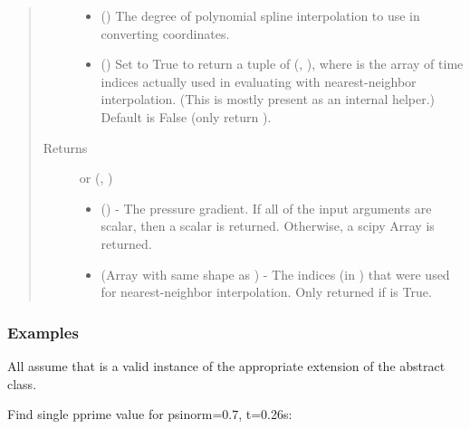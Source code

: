 \documentclass[letterpaper,10pt,english]{sphinxmanual}
\begin{document}
\begin{fulllineitems}
\begin{fulllineitems}
\begin{quote}
\begin{description}
\begin{itemize}
\item {} 
 () \textendash{} The degree of polynomial spline interpolation to
use in converting coordinates.

\item {} 
 () \textendash{} Set to True to return a tuple of (,
), where  is the array of time indices
actually used in evaluating  with nearest-neighbor
interpolation. (This is mostly present as an internal helper.)
Default is False (only return ).

\end{itemize}

\item[{Returns}] \leavevmode

 or (, )
\begin{itemize}
\item {} 
 () - The pressure gradient. If
all of the input arguments are scalar, then a scalar is returned.
Otherwise, a scipy Array is returned.

\item {} 
 (Array with same shape as ) - The indices
(in ) that were used for
nearest-neighbor interpolation. Only returned if  is
True.

\end{itemize}


\end{description}\end{quote}
\subsubsection*{Examples}

All assume that  is a valid instance of the appropriate
extension of the {\hyperref[\detokenize{eqtools:eqtools.core.Equilibrium}]{}} abstract class.

Find single pprime value for psinorm=0.7, t=0.26s:


\end{fulllineitems}
\end{fulllineitems}
\end{document}
